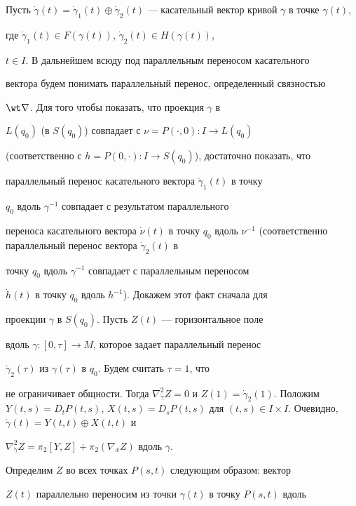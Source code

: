 \begin{pf}


Пусть $\Dot \gamma(t)=\Dot \gamma_1(t)\oplus \Dot 


\gamma_2(t)$ --- касательный вектор кривой $\gamma$ в точке $\gamma (t)$, 


где $\Dot\gamma_1(t)\in F(\gamma (t))$, $\Dot \gamma_2(t) \in H(\gamma (t))$, 


$t\in I$. В дальнейшем всюду под параллельным переносом касательного 


вектора будем понимать параллельный перенос, определенный связностью 


$\wt \nabla$. Для того чтобы показать, что проекция $\gamma$ в 


$L(q_0)$ (в $S(q_0)$) совпадает с $\nu= P(\cdot,0):I\to L(q_0)$ 


(соответственно с $h=P(0,\cdot):I\to S(q_0)$), достаточно показать, что 


параллельный перенос касательного вектора $\Dot \gamma_1(t)$ в точку 


$q_0$ вдоль $\gamma^{-1}$ совпадает с результатом параллельного 


переноса касательного вектора $\Dot \nu(t)$ в точку $q_0$ вдоль $\nu^{-


1}$ (соответственно параллельный перенос вектора $\Dot \gamma_2(t)$ в 


точку $q_0$ вдоль $\gamma^{-1}$ совпадает с параллельным переносом 


$\Dot h(t)$ в точку $q_0$ вдоль $h^{-1}$). Докажем этот факт сначала для 


проекции $\gamma$ в $S(q_0)$. Пусть $Z(t)$ --- горизонтальное поле


вдоль $\gamma:[0,\tau]\to M$, которое задает параллельный перенос


$\Dot\gamma_2(\tau)$ из $\gamma(\tau)$ в $q_0$. Будем считать $\tau=1$, что


не ограничивает общности. Тогда $\nabla^2_{\Dot \gamma}Z=0$ и $Z(1)=\Dot 


\gamma_2(1)$. Положим $Y(t,s)=D_tP(t,s)$, $X(t,s)=D_sP(t,s)$ для $(t,s)\in 


I\times I$. Очевидно, $\Dot \gamma(t)=Y(t,t)\oplus X(t,t)$ и 


$\nabla^2_{\Dot \gamma}Z=\pi_2[Y,Z]+\pi_2(\nabla_xZ)$ вдоль $\gamma$. 


Определим $Z$ во всех точках $P(s,t)$ следующим образом: вектор 


$Z(t)$ параллельно переносим из точки $\gamma (t)$ в точку $P(s,t)$ вдоль 



\end{pf}
